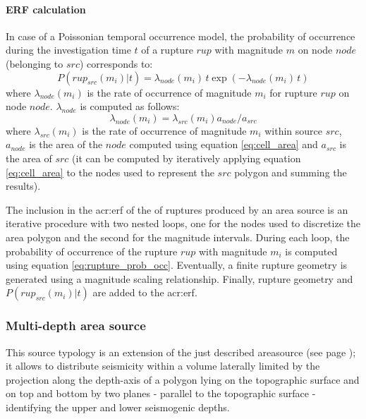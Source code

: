 \paragraph{ERF calculation}
\label{par:erf_calc_area_src}
In case of a Poissonian temporal occurrence model, the probability of 
occurrence during the investigation time $t$ of a rupture $rup$ with 
magnitude $m$ on node $node$ (belonging to $src$) corresponds to:
\begin{equation}
P(rup_{src}(m_i)|t)=\lambda_{node}(m_i)\,t\exp(-\lambda_{node}(m_i)\,t)
\label{eq:rupture_prob_occ}
\end{equation}
where $\lambda_{node}(m_i)$ is the rate of occurrence of magnitude $m_i$ 
for rupture $rup$ on node $node$. $\lambda_{node}$ is computed as follows:
\[ 
\lambda_{node}(m_i) = \lambda_{src}(m_i)a_{node}/a_{src}
\]
%
where $\lambda_{src}(m_i)$ is the rate of occurrence of magnitude $m_i$
within source $src$, $a_{node}$ is the area of the $node$ computed using
equation \ref{eq:cell_area} and $a_{src}$ is the area of $src$ (it can be
computed by iteratively applying equation \ref{eq:cell_area} to the 
nodes used to represent the $src$ polygon and summing the results). 

The inclusion in the \gls{acr:erf} of the of ruptures produced by 
an area source is an iterative procedure with two nested loops, one 
for the nodes used to discretize the area polygon and the second for 
the magnitude intervals. 
%
During each loop, the probability of occurrence of the rupture $rup$
with magnitude $m_i$ is computed using equation \ref{eq:rupture_prob_occ}.
Eventually, a finite rupture geometry is generated using a magnitude 
scaling relationship. Finally, rupture geometry and $P(rup_{src}(m_i)|t)$
are added to the \gls{acr:erf}.
%
\subsubsection{Multi-depth area source}
%
%
This source typology is an extension of the just described 
\gls{areasource} (see page \pageref{sec:areasource});
it allows to distribute seismicity within a volume laterally 
limited by the projection along the depth-axis of a polygon 
lying on the topographic surface and on top and bottom by 
two planes - parallel to the topographic surface - identifying the 
upper and lower seismogenic depths.


